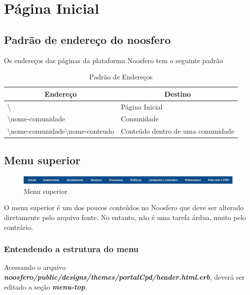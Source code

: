 \chapter{Página Inicial}
\label{chap:paginaInicial}

\section{Padrão de endereço do noosfero}
\label{sec:padraoEndereco}

Os endereços das páginas da plataforma Noosfero tem o seguinte padrão

\begin{table}[h]
\begin{tabular}{|l|l|}
  \hline
  \multicolumn{1}{|c|}{\textbf{Endereço}} & \multicolumn{1}{c|}{\textbf{Destino}} \\
  \hline
  \textbackslash & Página Inicial \\
  \textbackslash nome-comunidade & Comunidade \\
  \textbackslash nome-comunidade\textbackslash nome-conteudo & Conteúdo dentro de uma comunidade \\
  \hline
\end{tabular}
\caption {Padrão de Endereços}
\end{table}

\section{Menu superior}
\label{menuSuperior}
\begin{figure}[h]
     \centering
       \includegraphics[keepaspectratio=true,scale=0.49]{figuras/menu_superior}
     \caption{Menu superior}
\end{figure}

O menu superior é um dos poucos conteúdos no Noosfero que deve ser alterado 
diretamente pelo arquivo fonte. No entanto, não é uma tarefa árdua, muito pelo
contrário.

\newpage
\subsection{Entendendo a estrutura do menu}

Acessando o arquivo \emph{\textbf{noosfero/public/designs/themes/portalCpd/header.html.erb}},
deverá ser editado a seção \emph {\textbf{menu-top}}.

